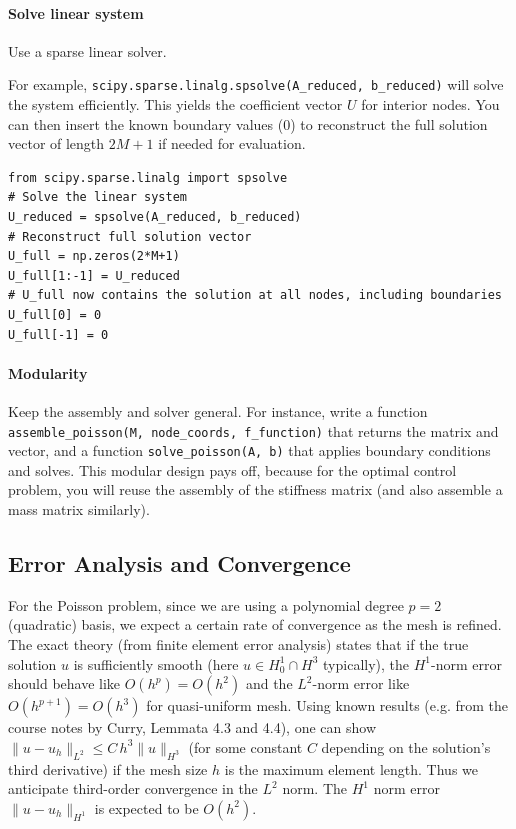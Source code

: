 \documentclass[a4paper,10pt]{article}
\begin{document}
\paragraph{Solve linear system}
Use a sparse linear solver. 

For example, \texttt{scipy.sparse.linalg.spsolve(A_reduced, b_reduced)} will solve the system efficiently.
This yields the coefficient vector \(U\) for interior nodes.
You can then insert the known boundary values (0) to reconstruct the full solution vector of length \(2M+1\) if needed for evaluation.
\begin{verbatim}
from scipy.sparse.linalg import spsolve
# Solve the linear system
U_reduced = spsolve(A_reduced, b_reduced)
# Reconstruct full solution vector
U_full = np.zeros(2*M+1)
U_full[1:-1] = U_reduced
# U_full now contains the solution at all nodes, including boundaries
U_full[0] = 0
U_full[-1] = 0
\end{verbatim}

\paragraph{Modularity}
Keep the assembly and solver general. For instance, write a function \texttt{assemble_poisson(M, node_coords, f_function)} that returns the matrix and vector, and a function \texttt{solve_poisson(A, b)} that applies boundary conditions and solves.
This modular design pays off, because for the optimal control problem, you will reuse the assembly of the stiffness matrix (and also assemble a mass matrix similarly).

\subsection{Error Analysis and Convergence}
For the Poisson problem, since we are using a polynomial degree \(p=2\) (quadratic) basis, we expect a certain rate of convergence as the mesh is refined.
The exact theory (from finite element error analysis) states that if the true solution \(u\) is sufficiently smooth (here \(u\in H^1_0\cap H^3\) typically), the \(H^1\)-norm error should behave like \(O(h^p) = O(h^2)\) and the \(L^2\)-norm error like \(O(h^{p+1}) = O(h^3)\) for quasi-uniform mesh.
Using known results (e.g. from the course notes by Curry, Lemmata 4.3 and 4.4), one can show \(\|u - u_h\|_{L^2} \le C\,h^3 \|u\|_{H^3}\) (for some constant \(C\) depending on the solution's third derivative) if the mesh size \(h\) is the maximum element length. Thus we anticipate third-order convergence in the \(L^2\) norm. The \(H^1\) norm error \(\|u-u_h\|_{H^1}\) is expected to be \(O(h^2)\).
\end{document}
